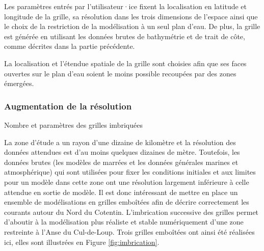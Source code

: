 \documentclass[10pt,a4paper,titlepage]{article}
\begin{document}
Les paramètres entrés par l'utilisateur·ice fixent la localisation en latitude et longitude de la grille, sa résolution dans les trois dimensions de l'espace ainsi que le choix de la restriction de la modélisation à un seul plan d'eau.
De plus, la grille est générée en utilisant les données brutes de bathymétrie et de trait de côte, comme décrites dans la partie précédente.

La localisation et l'étendue spatiale de la grille sont choisies afin que ses faces ouvertes sur le plan d'eau soient le moins possible recoupées par des zones émergées.

\subsubsection{Augmentation de la résolution}
{\color{lightgrey}
    Nombre et paramètres des grilles imbriquées
}

La zone d'étude a un rayon d'une dizaine de kilomètre et la résolution des données attendues est d'au moins quelques dizaines de mètre.
Toutefois, les données brutes (les modèles de marrées et les données générales marines et atmosphérique) qui sont utilisées pour fixer les conditions initiales et aux limites pour un modèle dans cette zone ont une résolution largement inférieure à celle attendue en sortie de modèle.
Il est donc intéressant de mettre en place un ensemble de modélisations en grilles emboîtées afin de décrire correctement les courants autour du Nord du Cotentin.
L'imbrication successive des grilles permet d'aboutir à la modélisation plus réaliste et stable numériquement d'une zone restreinte à l'Anse du Cul-de-Loup.
Trois grilles emboîtées ont ainsi été réalisées ici, elles sont illustrées en Figure \ref{fig:imbrication}.
\end{document}
